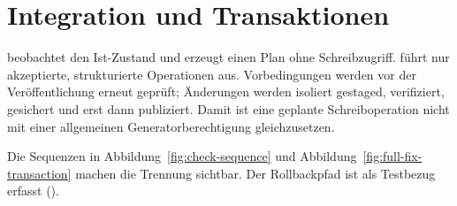 \section{Integration und Transaktionen}
\label{chap:integration-transactions}

\CheckMode{} beobachtet den Ist-Zustand und erzeugt einen Plan ohne Schreibzugriff.
\FullFix{} führt nur akzeptierte, strukturierte Operationen aus. Vorbedingungen werden
vor der Veröffentlichung erneut geprüft; Änderungen werden isoliert gestaged, verifiziert,
gesichert und erst dann publiziert. Damit ist eine geplante Schreiboperation nicht mit
einer allgemeinen Generatorberechtigung gleichzusetzen.

Die Sequenzen in Abbildung~\ref{fig:check-sequence} und
Abbildung~\ref{fig:full-fix-transaction} machen die Trennung sichtbar. Der
Rollbackpfad ist als \Verified{} Testbezug erfasst ().
